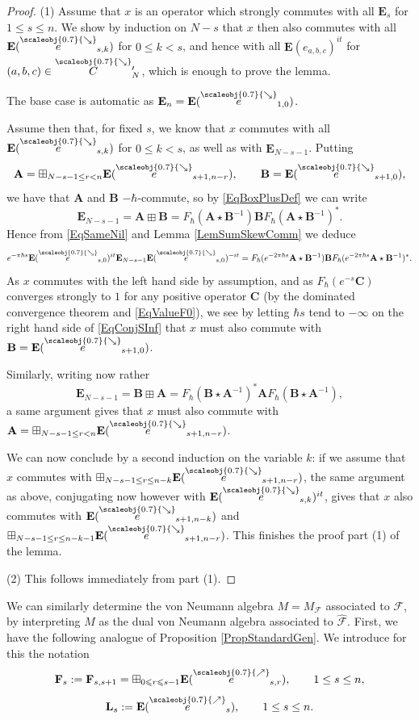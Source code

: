 \documentclass[11pt, reqno]{amsart}
\theoremstyle{definition}
\numberwithin{equation}{section}
\def\le{\leqslant}
\newcommand{\eb}{\mathbf{E}}
\newcommand{\Fct}{\mathcal{F}}
\newcommand{\nears}{\scaleobj{0.7}{\nearrow}}
\newcommand{\sears}{\scaleobj{0.7}{\searrow}}
\newcommand{\nee}{\overset{\nears}{e}}
\newcommand{\seee}{\overset{\sears}{e}}
\newcommand{\wseC}{\overset{\sears}{C}\,\!'}
\newcommand{\Eb}{\mathbf{E}}
\newcommand{\Lb}{\mathbf{L}}
\newcommand{\Ab}{\mathbf{A}}
\newcommand{\Bb}{\mathbf{B}}
\newcommand{\Cb}{\mathbf{C}}
\def\stgE{\mathbf{E}}
\def\stgF{\mathbf{F}}
\begin{document}
\begin{proof}
(1) Assume that $x$ is an operator which strongly commutes with all $\stgE_s$ for $1\leq s\leq n$. We show by induction on $N-s$ that $x$ then also commutes with all $\eb(\seee_{s,k})$ for $0\leq k <s$, and hence with all $\eb(e_{a,b,c})^{it}$ for $(a,b,c)\in \wseC_N$, which is enough to prove the lemma. 

The base case is automatic as $\stgE_n = \eb(\seee_{1,0})$. 

Assume then that, for fixed $s$, we know that $x$ commutes with all $\eb(\seee_{s,k})$ for $0\leq k <s$, as well as with $\stgE_{N-s-1}$. Putting 
\[
\Ab = \boxplus_{N-s-1\leq r <n} \eb(\seee_{s+1,n-r}),\qquad \Bb = \eb(\seee_{s+1,0}),
\]
we have that $\Ab$ and $\Bb$ $-\hbar$-commute, so by \eqref{EqBoxPlusDef} we can write 
\[
\stgE_{N-s-1} = \Ab \boxplus \Bb = F_{\hbar}(\Ab\star\Bb^{-1})\Bb F_{\hbar}(\Ab\star\Bb^{-1})^*.
\]
Hence from \eqref{EqSameNil} and Lemma \ref{LemSumSkewComm} we deduce 
\begin{equation}\label{EqConjSInf}
 e^{-\pi \hbar s} \Eb(\seee_{s,0})^{it} \stgE_{N-s-1} \Eb(\seee_{s,0})^{-it} =F_{\hbar}(e^{-2\pi \hbar s}\Ab\star\Bb^{-1})\Bb F_{\hbar}(e^{-2\pi \hbar s}\Ab\star\Bb^{-1})^*.
\end{equation}
As $x$ commutes with the left hand side by assumption, and as $F_{\hbar}(e^{-s}\Cb)$ converges strongly to $1$ for any positive operator $\Cb$ (by the dominated convergence theorem and \eqref{EqValueF0}), we see by letting $\hbar s$ tend to $-\infty$ on the right hand side of \eqref{EqConjSInf} that $x$ must also commute with $\Bb = \Eb(\seee_{s+1,0})$. 

Similarly, writing now rather 
\[
\stgE_{N-s-1} = \Bb \boxplus \Ab = F_{\hbar}(\Bb\star\Ab^{-1})^*\Ab F_{\hbar}(\Bb\star\Ab^{-1}),
\]
a same argument gives that $x$ must also commute with $\Ab = \boxplus_{N-s-1\leq r <n} \eb(\seee_{s+1,n-r})$. 

We can now conclude by a second induction on the variable $k$: if we assume that $x$ commutes with $\boxplus_{N-s-1\leq r \leq n-k} \eb(\seee_{s+1,n-r})$, the same argument as above, conjugating now however with $\Eb(\seee_{s,k})^{it}$, gives that $x$ also commutes with $\eb(\seee_{s+1,n-k})$ and $\boxplus_{N-s-1\leq r \leq n-k-1} \eb(\seee_{s+1,n-r})$. This finishes the proof part (1) of the lemma.

(2) This follows immediately from part (1).
\end{proof}

We can similarly determine the von Neumann algebra $M = M_{\Fct}$ associated to $\Fct$, by interpreting $M$ as the dual von Neumann algebra associated to $\hat{\Fct}$. First, we have the following analogue of Proposition \ref{PropStandardGen}. We introduce for this the notation \begin{equation}\label{EqGenFs}
\stgF_s := \stgF_{s,s+1} =  \boxplus_{0 \le r \le s-1} \eb(\nee_{s,r}),\qquad 1\leq s\leq n,
\end{equation}
\begin{equation}\label{EqCartanL}
\Lb_s := \eb(\nee_s),\qquad 1 \leq s \leq n.
\end{equation}
\end{document}
